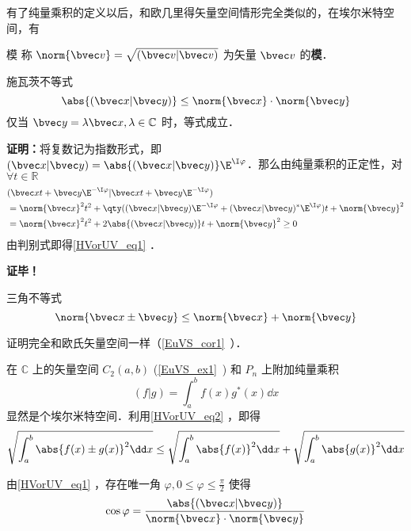 有了纯量乘积的定义以后，和欧几里得矢量空间情形完全类似的，在埃尔米特空间，有
\begin{definition}{模}
称 $\norm{\bvec v}=\sqrt{(\bvec v|\bvec v)}$ 为矢量 $\bvec v$ 的\textbf{模}．
\end{definition} 
\begin{theorem}{施瓦茨不等式}
\begin{equation}\label{HVorUV_eq1}
\abs{(\bvec x|\bvec y)}\leq \norm{\bvec x}\cdot \norm{\bvec y}
\end{equation}
仅当 $\bvec y=\lambda\bvec x,\lambda\in\mathbb{C}$ 时，等式成立．
\end{theorem}
\textbf{证明：}将复数记为指数形式，即 $(\bvec x|\bvec y)=\abs{(\bvec x|\bvec y)}\E^{\I \varphi}$．那么由纯量乘积的正定性，对 $\forall t\in\mathbb{R}$
\begin{equation}
\begin{aligned}
&(\bvec x t+\bvec y\E^{-\I\varphi}|\bvec x t+\bvec y\E^{-\I\varphi})\\
&=\norm{\bvec x}^2t^2+\qty((\bvec x|\bvec y)\E^{-\I\varphi}+(\bvec x|\bvec y)^*\E^{\I\varphi})t+\norm{\bvec y}^2\\
&=\norm{\bvec x}^2t^2+2\abs{(\bvec x|\bvec y)}t+\norm{\bvec y}^2\geq0
\end{aligned}
\end{equation}
由判别式即得\autoref{HVorUV_eq1} ．

\textbf{证毕！}
\begin{corollary}{三角不等式}
\begin{equation}\label{HVorUV_eq2}
\norm{\bvec x\pm\bvec y}\leq\norm{\bvec x}+\norm{\bvec y}
\end{equation}
\end{corollary}
证明完全和欧氏矢量空间一样（\autoref{EuVS_cor1}~）．
\begin{example}{}
在 $\mathbb{C}$ 上的矢量空间 $C_2(a,b)$ (\autoref{EuVS_ex1}~) 和 $P_n$ 上附加纯量乘积
\begin{equation}
(f|g)=\int_a^{b}f(x)g^*(x)\dd x
\end{equation}
显然是个埃尔米特空间．利用\autoref{HVorUV_eq2} ，即得
\begin{equation}
\sqrt{\int_a^b\abs{f(x)\pm g(x)}^2\dd x}\leq\sqrt{\int_a^b\abs{f(x)}^2\dd x}+\sqrt{\int_a^b\abs{g(x)}^2\dd x}
\end{equation}
\end{example}
由\autoref{HVorUV_eq1} ，存在唯一角 $\varphi,0\leq\varphi\leq\frac{\pi}{2}$ 使得
\begin{equation}
\cos\varphi=\frac{\abs{(\bvec x|\bvec y)}}{\norm{\bvec x}\cdot \norm{\bvec y}}
\end{equation}

